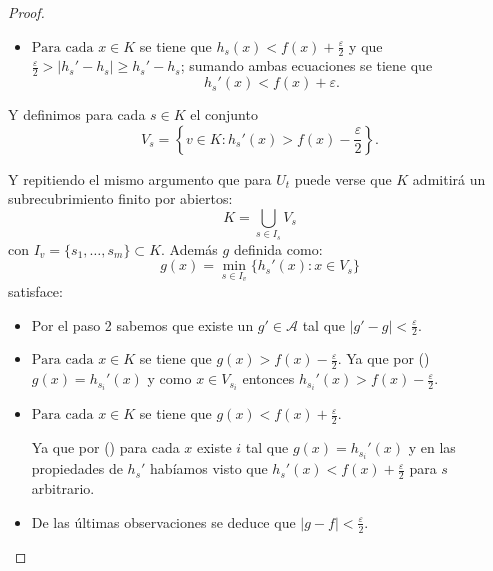 \begin{proof}
\begin{itemize}
        \item $\text{Para cada } x \in K$ se tiene que $h_s(x) < f(x) + \frac{\varepsilon}{2}$ y que $\frac{\varepsilon}{2} > |h_s' - h_s| \geq h_s' - h_s$; sumando ambas ecuaciones se tiene que 
        \begin{equation}
            h_s'(x) < f(x) + \varepsilon.
        \end{equation}
        
    \end{itemize} 
     

    Y definimos para cada $s \in K$ el conjunto 
    \begin{equation}\label{subrecubrimiento_s}
        V_s = \left\{
            v \in K  \colon
            h_s'(x) > f(x) - \frac{\varepsilon}{2}
            \right\}.
    \end{equation} 

    Y repitiendo el mismo argumento que para $U_t$ puede verse que $K$ admitirá un 
    subrecubrimiento finito por abiertos: 
    \begin{equation*}
        K = \bigcup_{s \in I_s} V_s
    \end{equation*}
    con $I_v = \{s_1, \ldots, s_m\} \subset K$. 
    Además $g$ definida como: 
    \begin{equation}
        g(x)= \min_{s \in I_v}
        \{ 
            h_{s}'(x) 
            \colon
            x \in V_s
        \} 
    \end{equation}
    satisface:  
    \begin{itemize}

        \item Por el paso 2 sabemos que existe un $g' \in \mathcal{A}$ tal que   $|g' - g| < \frac{\varepsilon}{2}$.
         
        \item $\text{Para cada } x \in K$ se tiene que $g(x) >f(x) - \frac{\varepsilon}{2}$.
        Ya que por 
        ()   
        $g(x) =  h_{s_i}'(x)$ y 
        como $x \in V_{s_i}$ entonces 
        $h_{s_i}'(x) > f(x) - \frac{\varepsilon}{2}$.
        \item $\text{Para cada } x \in K$ se tiene que $g(x) <f(x) + \frac{\varepsilon}{2}$.
        
        Ya que por 
        () para cada $x$ existe $i$ tal que 
        $g(x) =  h_{s_i}'(x)$ y 
        en las propiedades de $h_s'$ habíamos visto que
        $h_{s}'(x) < f(x) + \frac{\varepsilon}{2}$ para $s$ arbitrario.
        \item De las últimas observaciones se deduce que $|g-f| < \frac{\varepsilon}{2}$.


\end{itemize}
\end{proof}
